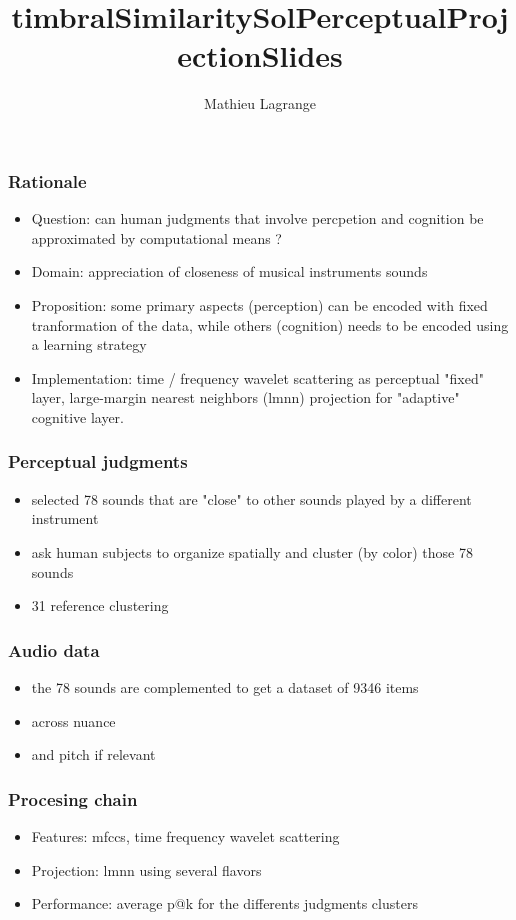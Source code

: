 \documentclass{beamer}
\title{timbralSimilaritySolPerceptualProjectionSlides}
\author{ Mathieu Lagrange }
\begin{document}
\maketitle

\begin{frame}\frametitle{Rationale}
\begin{itemize}
  \item Question: can human judgments that involve percpetion and cognition be approximated by computational means ?
  \item Domain: appreciation of closeness of musical instruments sounds
  \item Proposition: some primary aspects (perception) can be encoded with fixed tranformation of the data, while others (cognition) needs to be encoded using a learning strategy
  \item Implementation: time / frequency wavelet scattering as perceptual "fixed" layer, large-margin nearest neighbors (lmnn) projection for "adaptive" cognitive layer.
\end{itemize}
\end{frame}

\begin{frame}\frametitle{Perceptual judgments}
\begin{itemize}
  \item selected 78 sounds that are "close" to other sounds played by a different instrument
  \item ask human subjects to organize spatially and cluster (by color) those 78 sounds
  \item 31 reference clustering
\end{itemize}
\end{frame}

\begin{frame}\frametitle{Audio data}
\begin{itemize}
  \item the 78 sounds are complemented to get a dataset of 9346 items
  \item across nuance
  \item and pitch if relevant
\end{itemize}
\end{frame}

\begin{frame}\frametitle{Procesing chain}
\begin{itemize}
  \item Features: mfccs, time frequency wavelet scattering
  \item Projection: lmnn using several flavors
  \item Performance: average p@k for the differents judgments clusters
\end{itemize}
\end{frame}
\end{document}
